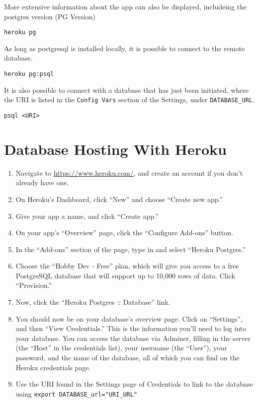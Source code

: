 \documentclass[]{book}
\providecommand{\tightlist}{%
  \setlength{\itemsep}{0pt}\setlength{\parskip}{0pt}}
\begin{document}
More extensive information about the app can also be displayed,
includeing the postgres version (PG Version)

\begin{verbatim}
heroku pg
\end{verbatim}

As long as postgresql is installed locally, it is possible to connect to
the remote database.

\begin{verbatim}
heroku pg:psql
\end{verbatim}

It is also possible to connect with a database that has just been
initiated, where the URI is listed in the \texttt{Config\ Vars} section
of the Settings, under \texttt{DATABASE\_URL}.

\begin{verbatim}
psql <URI>
\end{verbatim}

\section{Database Hosting With
Heroku}\label{database-hosting-with-heroku}

\begin{enumerate}
\def\labelenumi{\arabic{enumi}.}
\tightlist
\item
  Navigate to \url{https://www.heroku.com/}, and create an account if
  you don't already have one.
\item
  On Heroku's Dashboard, click ``New'' and choose ``Create new app.''
\item
  Give your app a name, and click ``Create app.''
\item
  On your app's ``Overview'' page, click the ``Configure Add-ons''
  button.
\item
  In the ``Add-ons'' section of the page, type in and select ``Heroku
  Postgres.''
\item
  Choose the ``Hobby Dev - Free'' plan, which will give you access to a
  free PostgreSQL database that will support up to 10,000 rows of data.
  Click ``Provision.''
\item
  Now, click the ``Heroku Postgres :: Database'' link.
\item
  You should now be on your database's overview page. Click on
  ``Settings'', and then ``View Credentials.'' This is the information
  you'll need to log into your database. You can access the database via
  Adminer, filling in the server (the ``Host'' in the credentials list),
  your username (the ``User''), your password, and the name of the
  database, all of which you can find on the Heroku credentials page.
\item
  Use the URI found in the Settings page of Credentials to link to the
  database using \texttt{export\ DATABASE\_url="URI\_URL"}
\end{enumerate}
\end{document}
